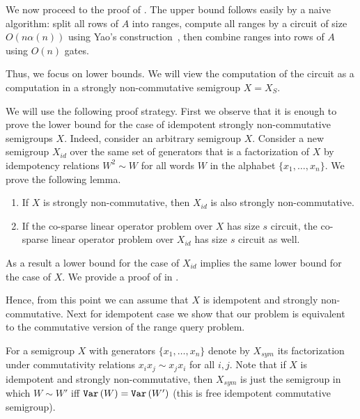 \documentclass{toc}
\begin{document}
We now proceed to the proof of . The upper bound
follows easily by a naive algorithm: split all rows of $A$ into ranges, compute
all ranges by a circuit of size $O(n\alpha(n))$ using Yao's
construction~\cite{DBLP:conf/stoc/Yao82}, then combine ranges into rows of $A$
using $O(n)$ gates.

Thus, we focus on lower bounds. We will view the computation of the circuit as a
computation in a strongly non-commutative semigroup $X=X_S$.

We will use the following proof strategy. First we observe that it is enough to
prove the lower bound for the case of idempotent strongly non-commutative
semigroups $X$. Indeed,
consider an arbitrary semigroup $X$. Consider a new semigroup $X_{id}$ over the same set of generators that is a factorization of $X$ by idempotency relations $W^2\sim W$ for all words $W$ in the alphabet $\{x_1,\ldots, x_n\}$.
We prove the following lemma.
\begin{lemma} \label{lem:idempotent_is_hardest}
	\begin{enumerate}
		\item If $X$ is strongly non-commutative, then $X_{id}$ is also strongly non-commutative.
		\item If the
        co-sparse
        linear operator problem over $X$ has size $s$
		circuit, the
        co-sparse
        linear operator problem over $X_{id}$ has size
		$s$ circuit as well.
	\end{enumerate}
\end{lemma}
As a result a lower bound for the case of $X_{id}$ implies the same lower bound for the case of $X$.
We provide a proof of  in
.

Hence, from this point we can assume that $X$ is idempotent and strongly
non-commutative. Next for idempotent case we show that our problem is equivalent
to the commutative version of the range query problem.

For a semigroup $X$ with generators $\{x_1,\ldots, x_n\}$ denote by $X_{sym}$
its factorization under commutativity relations
$x_i x_j \sim x_j x_i$ for all $i,j$. Note that if $X$ is idempotent and
strongly non-commutative, then $X_{sym}$ is just the semigroup in which
$W \sim W'$ iff $\texttt{Var}\,(W)=\texttt{Var}\,(W')$ (this is free idempotent commutative
semigroup).
\end{document}
